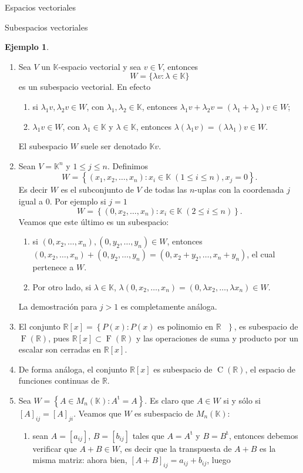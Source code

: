 \documentclass[a4paper,12pt,twoside,spanish]{amsbook}
\theoremstyle{definition}
\newtheorem{ejemplo}{Ejemplo}[section]
\theoremstyle{remark}
\renewcommand{\t}{{\operatorname{t}}}
\newcommand{\R}{\mathbb R}
\newcommand{\K}{\mathbb K}
\begin{document}
\begin{chapter}{Espacios vectoriales}
\begin{section}{Subespacios vectoriales}
\begin{ejemplo}
\begin{enumerate}
		\item Sea $V$ un $\K$-espacio vectorial y sea $v \in V$, entonces
		$$
		W = \{\lambda v: \lambda \in \K \}
		$$
		es un subespacio vectorial. En  efecto
		\begin{enumerate}
			\item si $\lambda_1v,\lambda_2v \in W$, con $\lambda_1,\lambda_2 \in \K$,  entonces $\lambda_1v + \lambda_2v = (\lambda_1+\lambda_2)v \in W$;
			\item  $\lambda_1v \in W$, con $\lambda_1 \in \K$ y $\lambda \in \K$,  entonces $\lambda(\lambda_1v) = (\lambda \lambda_1)v \in W$.
		\end{enumerate}
		El subespacio $W$ suele ser denotado $\K v$.
	
		
		\item Sean $V=\K^n$ y $1\le j \le n$. Definimos 
		$$
		W = \left\{ (x_1,x_2,\ldots,x_n): x_i \in \K\; (1 \le i \le n), x_j =0\right\}.
		$$
		Es decir $W$  es el subconjunto de $V$ de todas las $n$-uplas con la coordenada $j$ igual a 0. Por ejemplo  si $j=1$ 
		$$
		W = \left\{ (0,x_2,\ldots,x_n): x_i \in \K \;(2 \le i \le n)\right\}.
		$$
		Veamos que este último es un subespacio: 
		\begin{enumerate}
			\item si $(0,x_2,\ldots,x_n), (0,y_2,\ldots,y_n) \in W$,  entonces
			$(0,x_2,\ldots,x_n)+ (0,y_2,\ldots,y_n) = (0,x_2+y_2,\ldots,x_n+y_n)$, el cual pertenece a $W$. 
			\item 	Por otro lado, si $\lambda \in \K$, $\lambda(0,x_2,\ldots,x_n) = (0,\lambda x_2,\ldots,\lambda x_n) \in W$.
		\end{enumerate}
		La demostración para $j >1$ es completamente análoga. 
		\item El  conjunto $\R[x] = \left\{P(x): P(x) \text{ es polinomio en $\R$ } \right\}$, es subespacio de $\operatorname{F}(\R)$, pues $\R[x] \subset \operatorname{F}(\R)$ y las operaciones de suma y producto por un escalar son cerradas en $\R[x]$.
		\item De forma análoga, el conjunto $\R[x]$ es subespacio de $\operatorname{C}(\R)$,  el espacio de funciones continuas de  $\R$.
		\item Sea $W= \left\{A \in M_n(\K): A^\t = A \right\}$. Es claro que  $A \in W$ si y sólo si $[A]_{ij} = [A]_{ji}$. Veamos que  $W$ es subespacio de $M_n(\K)$: 
		\begin{enumerate}
			\item sean $A=[a_{ij}]$, $B= [b_{ij}]$ tales que $A=A^\t$ y $B=B^\t$, entonces debemos verificar que $A+ B \in W$,  es decir que la transpuesta de $A+B$  es la misma matriz: ahora bien, $[A+B]_{ij} = a_{ij}+b_{ij}$, luego 

\end{enumerate}
\end{enumerate}
\end{ejemplo}
\end{section}
\end{chapter}
\end{document}
